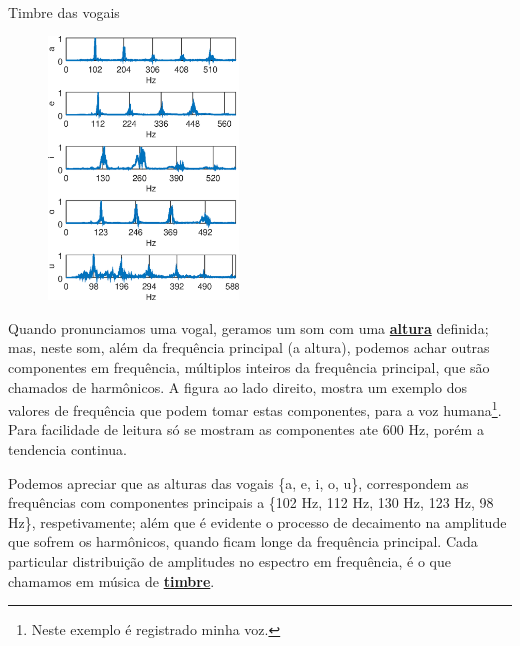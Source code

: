 ~\\



\begin{elaboracion}{Timbre das vogais}

\begin{figure}
\begin{center}
\includegraphics[width=0.45\textwidth]{chapters/cap-musica-basica/vocales-fourier.eps}
\end{center}
\end{figure}
Quando pronunciamos uma  vogal, geramos um som com uma \hyperref[sec:pos:Altura]{\textbf{altura}} definida;
mas, neste som, além da  frequência principal (a altura), podemos achar outras componentes em frequência,
múltiplos inteiros da  frequência principal, que são chamados de harmônicos.
A figura ao lado direito, mostra um exemplo dos valores de frequência 
que podem tomar estas componentes, para a voz humana\footnote{Neste exemplo é registrado minha voz.}.
Para facilidade de leitura só se mostram as componentes ate 600 Hz, 
porém a tendencia continua. 

Podemos apreciar que as alturas  das vogais \{a, e, i, o, u\}, 
correspondem as frequências com componentes principais a \{102 Hz, 112 Hz, 130 Hz, 123 Hz, 98 Hz\}, respetivamente;
além que é evidente o processo de decaimento na amplitude que sofrem os harmônicos,
quando ficam longe da frequência principal.
Cada particular distribuição de amplitudes no espectro em frequência, 
é o que chamamos em música de \hyperref[sec:pos:timbre]{\textbf{timbre}}.


\end{elaboracion}
